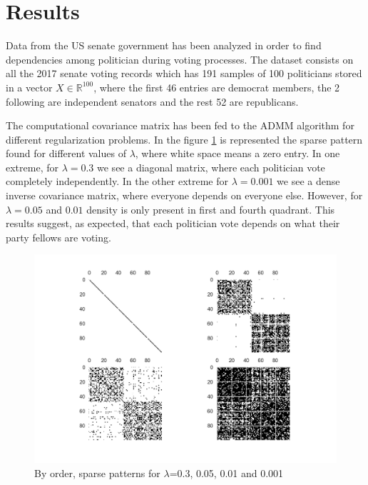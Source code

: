 \section{Results}

Data from the US senate government \cite{voting} has been analyzed in order to find dependencies among politician during voting processes. The dataset consists on all the 2017 senate voting records which has 191 samples of 100 politicians stored in a vector $X \in \mathbb{R}^{100}$, where the first 46 entries are democrat members, the 2 following are independent senators and the rest 52 are republicans.

The computational covariance matrix has been fed to the ADMM algorithm for different regularization problems. In the figure \ref{fig:sparse} is represented the sparse pattern found for different values of $\lambda$, where white space means a zero entry. In one extreme, for $\lambda=0.3$ we see a diagonal matrix, where each politician vote completely independently. In the other extreme for $\lambda=0.001$ we see a dense inverse covariance matrix, where everyone depends on everyone else. However, for $\lambda=0.05$ and $0.01$ density is only present in first and fourth quadrant. This results suggest, as expected, that each politician vote depends on what their party fellows are voting. 

\begin{figure}[h]
	\includegraphics[width=1.1\textwidth]{figures/sparse_pattern.png}
	\caption{By order, sparse patterns for $\lambda$=0.3, 0.05, 0.01 and 0.001}
	\label{fig:sparse}
\end{figure}

